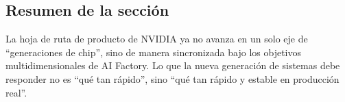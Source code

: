 \subsection{Resumen de la sección}

La hoja de ruta de producto de NVIDIA ya no avanza en un solo eje de ``generaciones de chip'', sino de manera sincronizada bajo los objetivos multidimensionales de AI Factory. Lo que la nueva generación de sistemas debe responder no es ``qué tan rápido'', sino ``qué tan rápido y estable en producción real''.
